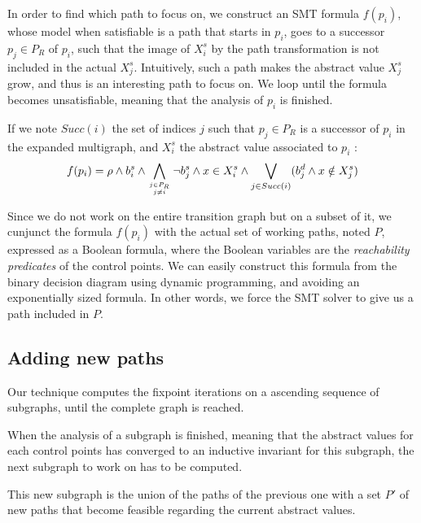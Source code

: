 \documentclass[preprint]{sigplanconf}
\begin{document}
In order to find which path to focus on, we construct an SMT formula $f(p_i)$, whose
model when satisfiable is a path that starts in $p_i$, goes to a successor $p_j
\in P_R$ of $p_i$, such that the image of $X_{i}^s$ by the path transformation
is not included in the actual $X_{j}^s$.
Intuitively, such a path makes the abstract value $X_{j}^s$ grow, and thus is
an interesting path to focus on. We loop until the formula becomes unsatisfiable,
meaning that the analysis of $p_i$ is finished.

If we note $Succ(i)$ the set of indices $j$ such that $p_j \in P_R$ is a
successor of $p_i$ in the expanded multigraph, and $X_i^s$ the abstract value
associated to $p_i$ :
$$f(p_i) = \rho \wedge b_i^s \wedge 
\displaystyle\bigwedge_{j \in P_R \atop j \neq i} \neg
b_j^s \wedge x \in X_i^s \wedge \displaystyle\bigvee_{j \in Succ(i)} (b_j^d \wedge
x \notin X_j^s)$$

Since we do not work on the entire transition graph but on a subset of it, we
cunjunct the formula $f(p_i)$ with the actual set of working paths,
noted $P$, expressed as a Boolean formula, where the Boolean variables are the
\emph{reachability predicates} of the control points. We can easily construct
this formula from the binary decision diagram using dynamic programming, and
avoiding an exponentially sized formula. In other words, we force the SMT solver
to give us a path included in $P$.


\subsection{Adding new paths}
\label{subsec:addingpaths}

Our technique computes the fixpoint iterations on a ascending sequence of
subgraphs, until the complete graph is reached.

When the analysis of a subgraph is finished, meaning that the abstract values
for each control points has converged to an inductive invariant for this subgraph,
the next subgraph to work on has to be computed.

This new subgraph is the union of the paths of the previous one with a set
$P'$ of new paths that become feasible regarding the current abstract values.
\end{document}
